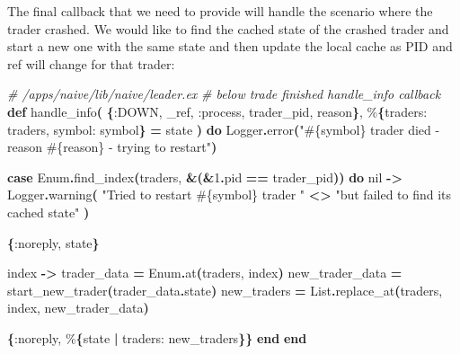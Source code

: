 \documentclass[
  oneside]{book}
\newenvironment{Shaded}{\begin{snugshade}}{\end{snugshade}}
\newcommand{\CommentTok}[1]{\textcolor[rgb]{0.56,0.35,0.01}{\textit{#1}}}
\newcommand{\ConstantTok}[1]{\textcolor[rgb]{0.56,0.35,0.01}{#1}}
\newcommand{\DecValTok}[1]{\textcolor[rgb]{0.00,0.00,0.81}{#1}}
\newcommand{\FunctionTok}[1]{\textcolor[rgb]{0.13,0.29,0.53}{\textbf{#1}}}
\newcommand{\KeywordTok}[1]{\textcolor[rgb]{0.13,0.29,0.53}{\textbf{#1}}}
\newcommand{\NormalTok}[1]{#1}
\newcommand{\OperatorTok}[1]{\textcolor[rgb]{0.81,0.36,0.00}{\textbf{#1}}}
\newcommand{\OtherTok}[1]{\textcolor[rgb]{0.56,0.35,0.01}{#1}}
\newcommand{\StringTok}[1]{\textcolor[rgb]{0.31,0.60,0.02}{#1}}
\newcommand{\VariableTok}[1]{\textcolor[rgb]{0.00,0.00,0.00}{#1}}
\begin{document}
The final callback that we need to provide will handle the scenario where the trader crashed. We would like to find the cached state of the crashed trader and start a new one with the same state and then update the local cache as PID and ref will change for that trader:

\begin{Shaded}
\begin{Highlighting}[]
  \CommentTok{\# /apps/naive/lib/naive/leader.ex}
  \CommentTok{\# below trade finished handle\_info callback}
  \KeywordTok{def}\NormalTok{ handle\_info}\FunctionTok{(}
        \FunctionTok{\{}\VariableTok{:DOWN}\NormalTok{, \_ref, }\VariableTok{:process}\NormalTok{, trader\_pid, reason}\FunctionTok{\}}\NormalTok{,}
\NormalTok{        \%}\FunctionTok{\{}\VariableTok{traders:}\NormalTok{ traders, }\VariableTok{symbol:}\NormalTok{ symbol}\FunctionTok{\}} \OperatorTok{=}\NormalTok{ state}
      \FunctionTok{)} \KeywordTok{do}
    \ConstantTok{Logger}\OperatorTok{.}\NormalTok{error}\FunctionTok{(}\StringTok{"}\OtherTok{\#\{}\NormalTok{symbol}\OtherTok{\}}\StringTok{ trader died {-} reason }\OtherTok{\#\{}\NormalTok{reason}\OtherTok{\}}\StringTok{ {-} trying to restart"}\FunctionTok{)}

    \KeywordTok{case} \ConstantTok{Enum}\OperatorTok{.}\NormalTok{find\_index}\FunctionTok{(}\NormalTok{traders, }\OperatorTok{\&}\FunctionTok{(}\OperatorTok{\&}\DecValTok{1}\OperatorTok{.}\NormalTok{pid }\OperatorTok{==}\NormalTok{ trader\_pid}\FunctionTok{))} \KeywordTok{do}
      \ConstantTok{nil} \OperatorTok{{-}\textgreater{}}
        \ConstantTok{Logger}\OperatorTok{.}\NormalTok{warning}\FunctionTok{(}
          \StringTok{"Tried to restart }\OtherTok{\#\{}\NormalTok{symbol}\OtherTok{\}}\StringTok{ trader "} \OperatorTok{\textless{}\textgreater{}}
            \StringTok{"but failed to find its cached state"}
        \FunctionTok{)}

        \FunctionTok{\{}\VariableTok{:noreply}\NormalTok{, state}\FunctionTok{\}}

\NormalTok{      index }\OperatorTok{{-}\textgreater{}}
\NormalTok{        trader\_data }\OperatorTok{=} \ConstantTok{Enum}\OperatorTok{.}\NormalTok{at}\FunctionTok{(}\NormalTok{traders, index}\FunctionTok{)}
\NormalTok{        new\_trader\_data }\OperatorTok{=}\NormalTok{ start\_new\_trader}\FunctionTok{(}\NormalTok{trader\_data}\OperatorTok{.}\NormalTok{state}\FunctionTok{)}
\NormalTok{        new\_traders }\OperatorTok{=} \ConstantTok{List}\OperatorTok{.}\NormalTok{replace\_at}\FunctionTok{(}\NormalTok{traders, index, new\_trader\_data}\FunctionTok{)}

        \FunctionTok{\{}\VariableTok{:noreply}\NormalTok{, \%}\FunctionTok{\{}\NormalTok{state }\OperatorTok{|} \VariableTok{traders:}\NormalTok{ new\_traders}\FunctionTok{\}\}}
    \KeywordTok{end}
  \KeywordTok{end}
\end{Highlighting}
\end{Shaded}
\end{document}
